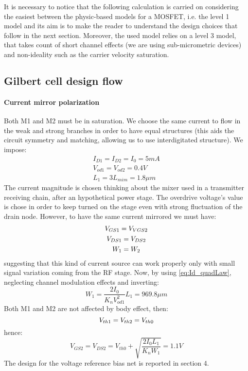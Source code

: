 It is necessary to notice that the following calculation is carried on considering the easiest between the physic-based models for a MOSFET, i.e. the level 1 model and its aim is to make the reader to understand the design choices that follow in the next section. Moreover, the used model relies on a level 3 model, that takes count of short channel effects (we are using sub-micrometric devices) and non-ideality such as the carrier velocity saturation. 

\subsection{Gilbert cell design flow} 

\paragraph{Current mirror polarization}

Both M1 and M2 must be in saturation. We choose the same current to flow in the weak and strong branches in order to have equal structures (this aids the circuit symmetry and matching, allowing us to use interdigitated structure). We impose:
\begin{gather}
I_{D1} = I_{D2} = I_0 = 5 mA  \\
V_{od1}=V_{od2}=0.4 V  \\
L_1 =3 L_{mim} = 1.8 \mu m 
\end{gather} 
The current magnitude is chosen thinking about the mixer used in a transmitter receiving chain, after an hypothetical power stage. The overdrive voltage's value is chose in order to keep turned on the stage even with strong fluctuation of the drain node. However, to have the same current mirrored we must have:
\begin{gather}
	V_{GS1} = V_{VGS2} \notag \\
	V_{DS1} = V_{DS2} \notag \\
	W_1 = W_2 \notag 
\end{gather}
suggesting that this kind of current source can work properly only with small signal variation coming from the RF stage. Now, by using \ref{eq:Id_quadLaw}, neglecting channel modulation effects and inverting:
\begin{equation}
W_1 = \frac{2I_0}{K_n V_{od1}^2}L_1 = 969.8 \mu m
\end{equation}
Both M1 and M2 are not affected by body effect, then:
\begin{equation}
	V_{th1}=V_{th2}=V_{th0} \notag \\
\end{equation}
hence:
\begin{equation}
V_{GS2}=V_{DS2}= V_{th0}+\sqrt{\frac{2I_0L_1}{K_n W_1 }} = 1.1 V
\end{equation}
The design for the voltage reference bias net is reported in section 4.
